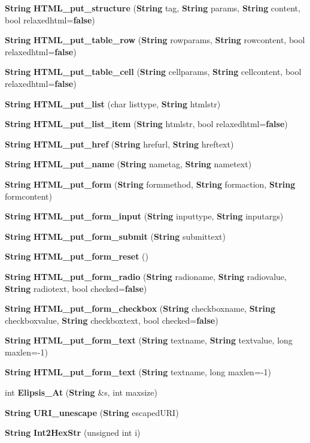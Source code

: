 \begin{CompactItemize}
\item 
{\bf String} {\bf HTML\_\-put\_\-structure} ({\bf String} tag, {\bf String} params, {\bf String} content, bool relaxedhtml={\bf false})
\item 
{\bf String} {\bf HTML\_\-put\_\-table\_\-row} ({\bf String} rowparams, {\bf String} rowcontent, bool relaxedhtml={\bf false})
\item 
{\bf String} {\bf HTML\_\-put\_\-table\_\-cell} ({\bf String} cellparams, {\bf String} cellcontent, bool relaxedhtml={\bf false})
\item 
{\bf String} {\bf HTML\_\-put\_\-list} (char listtype, {\bf String} htmlstr)
\item 
{\bf String} {\bf HTML\_\-put\_\-list\_\-item} ({\bf String} htmlstr, bool relaxedhtml={\bf false})
\item 
{\bf String} {\bf HTML\_\-put\_\-href} ({\bf String} hrefurl, {\bf String} hreftext)
\item 
{\bf String} {\bf HTML\_\-put\_\-name} ({\bf String} nametag, {\bf String} nametext)
\item 
{\bf String} {\bf HTML\_\-put\_\-form} ({\bf String} formmethod, {\bf String} formaction, {\bf String} formcontent)
\item 
{\bf String} {\bf HTML\_\-put\_\-form\_\-input} ({\bf String} inputtype, {\bf String} inputargs)
\item 
{\bf String} {\bf HTML\_\-put\_\-form\_\-submit} ({\bf String} submittext)
\item 
{\bf String} {\bf HTML\_\-put\_\-form\_\-reset} ()
\item 
{\bf String} {\bf HTML\_\-put\_\-form\_\-radio} ({\bf String} radioname, {\bf String} radiovalue, {\bf String} radiotext, bool checked={\bf false})
\item 
{\bf String} {\bf HTML\_\-put\_\-form\_\-checkbox} ({\bf String} checkboxname, {\bf String} checkboxvalue, {\bf String} checkboxtext, bool checked={\bf false})
\item 
{\bf String} {\bf HTML\_\-put\_\-form\_\-text} ({\bf String} textname, {\bf String} textvalue, long maxlen=-1)
\item 
{\bf String} {\bf HTML\_\-put\_\-form\_\-text} ({\bf String} textname, long maxlen=-1)
\item 
int {\bf Elipsis\_\-At} ({\bf String} \&s, int maxsize)
\item 
{\bf String} {\bf URI\_\-unescape} ({\bf String} escaped\-URI)
\item 
{\bf String} {\bf Int2Hex\-Str} (unsigned int i)
\item 

\end{CompactItemize}
